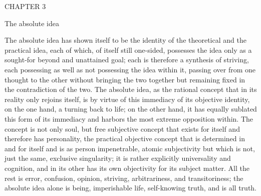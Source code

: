 CHAPTER 3

The absolute idea

The absolute idea has shown itself to be
the identity of the theoretical and the practical idea,
each of which, of itself still one-sided, possesses the idea
only as a sought-for beyond and unattained goal;
each is therefore a synthesis of striving,
each possessing as well as not possessing the idea within it,
passing over from one thought to the other
without bringing the two together
but remaining fixed in the contradiction of the two.
The absolute idea, as the rational concept
that in its reality only rejoins itself,
is by virtue of this immediacy of its objective identity,
on the one hand, a turning back to life;
on the other hand, it has equally
sublated this form of its immediacy
and harbors the most extreme opposition within.
The concept is not only soul,
but free subjective concept
that exists for itself
and therefore has personality,
the practical objective concept
that is determined in and for itself
and is as person impenetrable, atomic subjectivity
but which is not, just the same, exclusive singularity;
it is rather explicitly universality and cognition,
and in its other has its own objectivity for its subject matter.
All the rest is error, confusion, opinion,
striving, arbitrariness, and transitoriness;
the absolute idea alone is being, imperishable life,
self-knowing truth, and is all truth.

